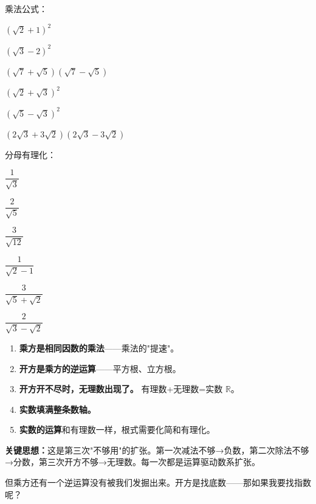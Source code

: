 \begin{exercise}
\item 乘法公式：
  \begin{subexercise}
    \item $(\sqrt{2}+1)^2$
    \item $(\sqrt{3}-2)^2$
    \item $(\sqrt{7}+\sqrt{5})(\sqrt{7}-\sqrt{5})$
    \item $(\sqrt{2}+\sqrt{3})^2$
    \item $(\sqrt{5}-\sqrt{3})^2$
    \item $(2\sqrt{3}+3\sqrt{2})(2\sqrt{3}-3\sqrt{2})$
  \end{subexercise}

\item 分母有理化：
  \begin{subexercise}
    \item $\dfrac{1}{\sqrt{3}}$
    \item $\dfrac{2}{\sqrt{5}}$
    \item $\dfrac{3}{\sqrt{12}}$
    \item $\dfrac{1}{\sqrt{2}-1}$
    \item $\dfrac{3}{\sqrt{5}+\sqrt{2}}$
    \item $\dfrac{2}{\sqrt{3}-\sqrt{2}}$
  \end{subexercise}
\end{exercise}


\begin{enumerate}
  \item \textbf{乘方是相同因数的乘法}——乘法的"提速"。
  \item \textbf{开方是乘方的逆运算}——平方根、立方根。
  \item \textbf{开方开不尽时，无理数出现了。} 有理数+无理数=实数 $\mathbb{R}$。
  \item \textbf{实数填满整条数轴。}
  \item \textbf{实数的运算}和有理数一样，根式需要化简和有理化。
\end{enumerate}

\textbf{关键思想：}这是第三次"不够用"的扩张。第一次减法不够→负数，第二次除法不够→分数，第三次开方不够→无理数。每一次都是运算驱动数系扩张。

但乘方还有一个逆运算没有被我们发掘出来。开方是找底数——那如果我要找指数呢？

\bigskip

\begin{center}
\end{center}
